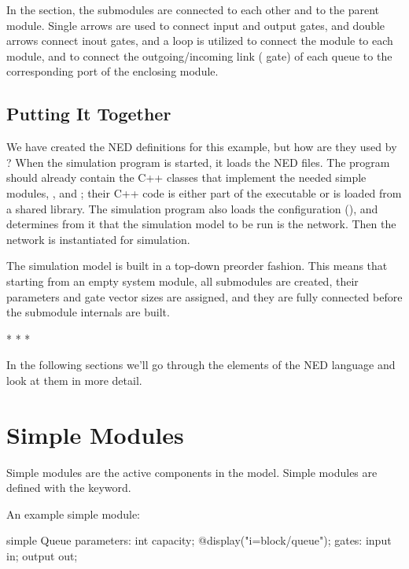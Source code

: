 In the  section, the submodules are connected to each
other and to the parent module. Single arrows are used to connect input and
output gates, and double arrows connect inout gates, and a  loop
is utilized to connect the  module to each  module, and
to connect the outgoing/incoming link ( gate) of each queue to the
corresponding port of the enclosing module.


\subsection{Putting It Together}
\label{sec:ned-lang:warmup:putting-it-together}

We have created the NED definitions for this example, but how are they used by {\opp}? When
the simulation program is started, it loads the NED files. The program
should already contain the C++ classes that implement the needed simple
modules, ,  and ; their C++ code is either
part of the executable or is loaded from a shared library. The simulation
program also loads the configuration (), and determines
from it that the simulation model to be run is the  network.
Then the network is instantiated for simulation.

The simulation model is built in a top-down preorder fashion. This means
that starting from an empty system module, all submodules are created,
their parameters and gate vector sizes are assigned, and they are fully connected
before the submodule internals are built.

\bigskip
\begin{center}
* * *
\end{center}
\bigskip

In the following sections we'll go through the elements of the NED
language and look at them in more detail.



\section{Simple Modules}
\label{sec:ned-lang:simple-modules}

Simple modules are the active components in the model.
Simple modules are defined with the  keyword.

An example simple module:

\begin{ned}
simple Queue
{
    parameters:
        int capacity;
        @display("i=block/queue");
    gates:
        input in;
        output out;
}
\end{ned}

